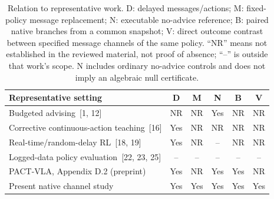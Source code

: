 \documentclass[10pt,a4paper]{article}
\begin{document}
\setcounter{table}{0}
\begin{table}[H]\centering\small
\caption{Relation to representative work. D: delayed messages/actions; M: fixed-policy message replacement; N: executable no-advice reference; B: paired native branches from a common snapshot; V: direct outcome contrast between specified message channels of the same policy. ``NR'' means not established in the reviewed material, not proof of absence; ``--'' is outside that work's scope. N includes ordinary no-advice controls and does not imply an algebraic null certificate.}
\setlength{\tabcolsep}{4pt}
\begin{tabular}{p{6.1cm}ccccc}\toprule Representative setting & D & M & N & B & V\\\midrule
Budgeted advising~[1, 12] & NR & NR & Yes & NR & NR\\
Corrective continuous-action teaching~[16] & Yes & NR & NR & NR & NR\\
Real-time/random-delay RL~[18, 19] & Yes & NR & -- & NR & NR\\
Logged-data policy evaluation~[22, 23, 25] & -- & -- & -- & -- & --\\
PACT-VLA, Appendix D.2 (preprint) & Yes & NR & Yes & Yes & NR\\
Present native channel study & Yes & Yes & Yes & Yes & Yes\\\bottomrule
\end{tabular}
\end{table}
\end{document}
